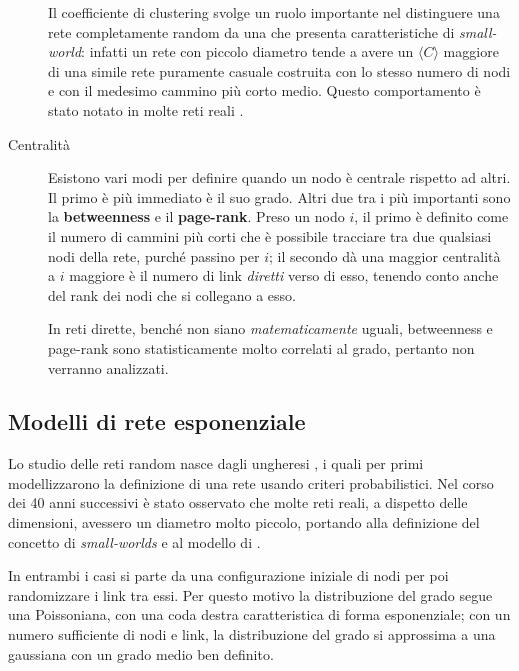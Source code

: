\begin{description}
	Il coefficiente di clustering svolge un ruolo importante nel distinguere una rete completamente random da una che presenta caratteristiche di \emph{small-world}: infatti un rete con piccolo diametro tende a avere un $\langle C\rangle$ maggiore di una simile rete puramente casuale costruita con lo stesso numero di nodi e con il medesimo cammino più corto medio. Questo comportamento è stato notato in molte reti reali \parencite{Watts1998}.
	\item[Centralit\`a] Esistono vari modi per definire quando un nodo è centrale rispetto ad altri. Il primo è più immediato è il suo grado. Altri due tra i più importanti sono la \textbf{betweenness} e il \textbf{page-rank}. Preso un nodo $i$, il primo è definito come il numero di cammini più corti che è possibile tracciare tra due qualsiasi nodi della rete, purché passino per $i$; il secondo dà una maggior centralità a $i$ maggiore è il numero di link \emph{diretti} verso di esso, tenendo conto anche del rank dei nodi che si collegano a esso. 
	
	In reti dirette, benché non siano \emph{matematicamente} uguali, betweenness e page-rank sono statisticamente molto correlati al grado, pertanto non verranno analizzati. 
\end{description}

\subsection{Modelli di rete esponenziale }
Lo studio delle reti random nasce dagli ungheresi \textcite{Erdos1959}, i quali per primi modellizzarono la definizione di una rete usando criteri probabilistici. Nel corso dei 40 anni successivi è stato osservato che molte reti reali, a dispetto delle dimensioni, avessero un diametro molto piccolo, portando alla definizione del concetto di \emph{small-worlds} e al modello di \textcite{Watts1998}.

In entrambi i casi si parte da una configurazione iniziale di nodi per poi randomizzare i link tra essi. Per questo motivo la distribuzione del grado segue una Poissoniana, con una coda destra caratteristica di forma esponenziale; con un numero sufficiente di nodi e link, la distribuzione del grado si approssima a una gaussiana con un grado medio ben definito.

